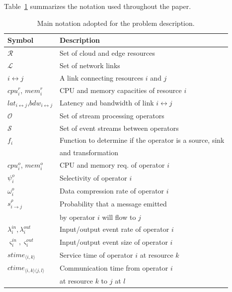 Table~\ref{tab:symbology} summarizes the notation used throughout the paper.
\begin{table}[ht]
  \centering
  \caption{Main notation adopted for the problem description.}
  \label{tab:symbology}
  \begin{tabular}{ll}
    \toprule
    Symbol & Description\\
    \midrule
    $\mathcal{R}$ & Set of cloud and edge resources\\
    $\mathcal{L}$ & Set of network links\\
    $i\!\leftrightarrow\!j$ & A link connecting resources $i$ and $j$ \\
    $cpu^r_i$, $mem^r_i$ & CPU and memory capacities of resource $i$ \\
    $lat_{i\!\leftrightarrow\!j}$,$bdw_{i\!\leftrightarrow\!j}$ & Latency and bandwidth of link $i\!\leftrightarrow\!j$ \\
    $\mathcal{O}$ & Set of stream processing operators \\
    $\mathcal{S}$ & Set of event streams between operators \\
    $f_i$ & Function to determine if the operator is a source, sink \\
    & and transformation\\
    $cpu^o_i$, $mem^o_i$ & CPU and memory req. of operator $i$\\
    $\psi^o_i$ & Selectivity of operator $i$\\
    $\omega^o_i$ & Data compression rate of operator $i$\\
    $s^{\rho}_{i\rightarrow j}$ & Probability that a message emitted\\ 
    &  by operator $i$ will flow to $j$\\ 
    $\lambda_i^{in},\lambda_i^{out}$ & Input/output event rate of operator $i$\\
    $\varsigma_i^{in},\varsigma_i^{out}$ & Input/output event size of operator $i$\\
    $stime_{\langle i,k\rangle}$ & Service time of operator $i$ at resource $k$\\
    $ctime_{\langle i,k\rangle\langle j,l\rangle}$ & Communication time from operator $i$ \\ 
    & at resource $k$ to $j$ at $l$ \\

\end{tabular}
\end{table}
